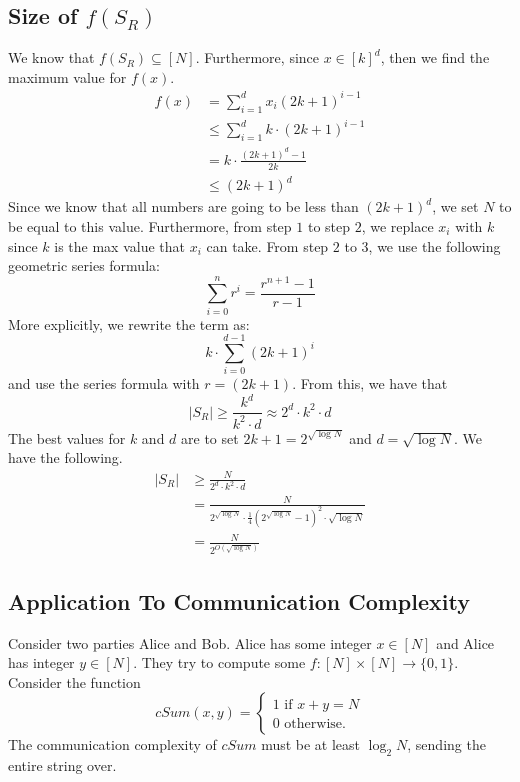 \documentclass[11pt]{article}
\theoremstyle{definition}
\begin{document}
\subsection{Size of $f(S_R)$}
We know that $f(S_R) \subseteq [N]$.
    Furthermore, since $x \in [k]^d$, then we find the maximum value for $f(x)$.
    \begin{align}
        f(x) &= \sum_{i=1}^d x_i (2k+1)^{i-1}\\
        &\leq \sum_{i=1}^d k \cdot (2k+1)^{i-1}\\
        &= k \cdot \frac{(2k+1)^d-1}{2k}\\
        &\leq (2k+1)^d
    \end{align}
    Since we know that all numbers are going to be less than $(2k+1)^d$, we set $N$ to be equal to this value. Furthermore, from step $1$ to step $2$, we replace $x_i$ with $k$ since $k$ is the max value that $x_i$ can take. From step $2$ to $3$, we use the following geometric series formula:
    $$\sum_{i=0}^n r^i = \frac{r^{n+1}-1}{r-1}$$
    More explicitly, we rewrite the term as:
    $$k \cdot \sum_{i=0}^{d-1} (2k+1)^i$$
    and use the series formula with $r=(2k+1)$.
    From this, we have that 
    $$|S_R| \geq \frac{k^d}{k^2 \cdot d} \approx 2^d \cdot k^2 \cdot d$$
The best values for $k$ and $d$ are to set $2k+1 = 2^{\sqrt{\log N}}$ and $d = \sqrt{\log N}$. We have the following.
\begin{align*}
    |S_R| &\geq \frac{N}{2^d \cdot k^2 \cdot d}\\
    &= \frac{N}{2^{\sqrt{\log N}} \cdot \frac{1}{4}(2^{\sqrt{\log N}}-1)^2 \cdot \sqrt{\log N}}\\
    &= \frac{N}{2^{O(\sqrt{\log N})}}
\end{align*}

\subsection{Application To Communication Complexity}
Consider two parties Alice and Bob. Alice has some integer $x \in [N]$ and Alice has integer $y \in [N]$. They try to compute some $f: [N] \times [N] \rightarrow \{0,1\}$. Consider the function $$cSum(x,y) = \begin{cases}
    1 \text{ if } x + y = N\\
    0 \text{ otherwise.}
\end{cases}$$
The communication complexity of $cSum$ must be at least $\log_2 N$, sending the entire string over.
\bigskip
\end{document}
